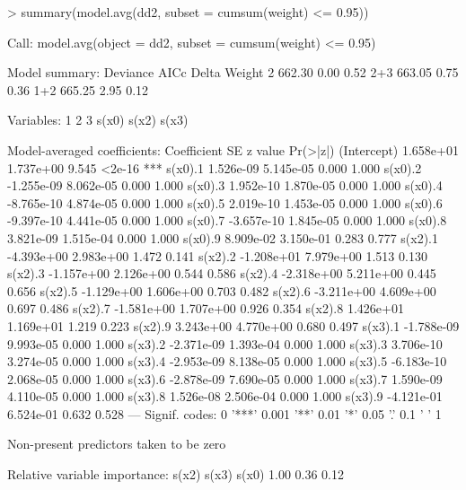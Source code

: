 \documentclass{article}
\begin{document}
\begin{Schunk}
\begin{Sinput}
> summary(model.avg(dd2, subset = cumsum(weight) <= 0.95))
\end{Sinput}
\begin{Soutput}
Call:  model.avg(object = dd2, subset = cumsum(weight) <= 0.95)


Model summary:
    Deviance   AICc Delta Weight
2            662.30  0.00   0.52
2+3          663.05  0.75   0.36
1+2          665.25  2.95   0.12

Variables:
    1     2     3 
s(x0) s(x2) s(x3) 

Model-averaged coefficients:
            Coefficient         SE z value Pr(>|z|)    
(Intercept)   1.658e+01  1.737e+00   9.545   <2e-16 ***
s(x0).1       1.526e-09  5.145e-05   0.000    1.000    
s(x0).2      -1.255e-09  8.062e-05   0.000    1.000    
s(x0).3       1.952e-10  1.870e-05   0.000    1.000    
s(x0).4      -8.765e-10  4.874e-05   0.000    1.000    
s(x0).5       2.019e-10  1.453e-05   0.000    1.000    
s(x0).6      -9.397e-10  4.441e-05   0.000    1.000    
s(x0).7      -3.657e-10  1.845e-05   0.000    1.000    
s(x0).8       3.821e-09  1.515e-04   0.000    1.000    
s(x0).9       8.909e-02  3.150e-01   0.283    0.777    
s(x2).1      -4.393e+00  2.983e+00   1.472    0.141    
s(x2).2      -1.208e+01  7.979e+00   1.513    0.130    
s(x2).3      -1.157e+00  2.126e+00   0.544    0.586    
s(x2).4      -2.318e+00  5.211e+00   0.445    0.656    
s(x2).5      -1.129e+00  1.606e+00   0.703    0.482    
s(x2).6      -3.211e+00  4.609e+00   0.697    0.486    
s(x2).7      -1.581e+00  1.707e+00   0.926    0.354    
s(x2).8       1.426e+01  1.169e+01   1.219    0.223    
s(x2).9       3.243e+00  4.770e+00   0.680    0.497    
s(x3).1      -1.788e-09  9.993e-05   0.000    1.000    
s(x3).2      -2.371e-09  1.393e-04   0.000    1.000    
s(x3).3       3.706e-10  3.274e-05   0.000    1.000    
s(x3).4      -2.953e-09  8.138e-05   0.000    1.000    
s(x3).5      -6.183e-10  2.068e-05   0.000    1.000    
s(x3).6      -2.878e-09  7.690e-05   0.000    1.000    
s(x3).7       1.590e-09  4.110e-05   0.000    1.000    
s(x3).8       1.526e-08  2.506e-04   0.000    1.000    
s(x3).9      -4.121e-01  6.524e-01   0.632    0.528    
---
Signif. codes:  0 '***' 0.001 '**' 0.01 '*' 0.05 '.' 0.1 ' ' 1 

Non-present predictors taken to be zero 

Relative variable importance:
s(x2) s(x3) s(x0) 
 1.00  0.36  0.12 
\end{Soutput}
\end{Schunk}
\end{document}
